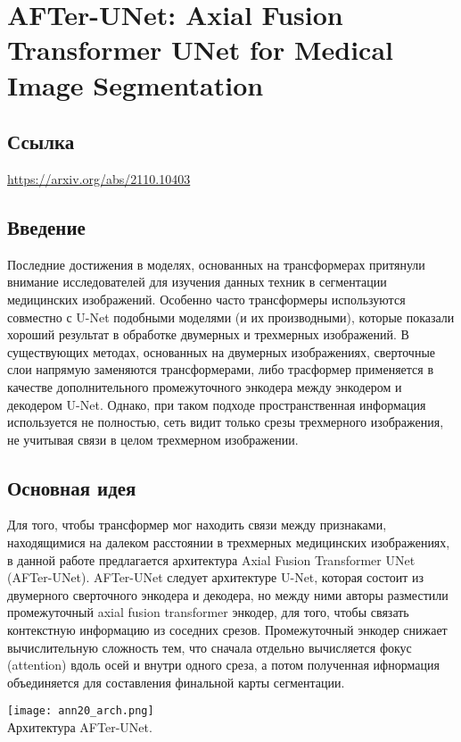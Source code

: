\section{AFTer-UNet: Axial Fusion Transformer UNet for Medical Image Segmentation}

\subsection*{Ссылка} \url{https://arxiv.org/abs/2110.10403}
\subsection*{Введение}
Последние достижения в моделях, основанных на трансформерах 
притянули внимание исследователей для изучения данных техник 
в сегментации медицинских изображений. Особенно часто трансформеры используются 
совместно с  U-Net подобными моделями (и их производными), которые показали 
хороший результат в обработке двумерных и трехмерных изображений.
В существующих методах, основанных на двумерных изображениях, 
сверточные слои напрямую заменяются трансформерами, либо трасформер применяется в 
качестве дополнительного промежуточного энкодера между энкодером и декодером U-Net. 
Однако, при таком подходе пространственная информация используется не полностью, сеть 
видит только срезы трехмерного изображения, не учитывая связи в целом трехмерном изображении.

\subsection*{Основная идея}
Для того, чтобы трансформер мог находить связи между признаками, 
находящимися на далеком расстоянии в трехмерных медицинских изображениях,
в данной работе предлагается архитектура Axial Fusion Transformer UNet (AFTer-UNet).
AFTer-UNet следует архитектуре U-Net, которая состоит из двумерного сверточного энкодера 
и декодера, но между ними авторы разместили промежуточный axial fusion transformer энкодер, 
для того, чтобы связать контекстную информацию из соседних срезов. Промежуточный 
энкодер снижает вычислительную сложность тем, что сначала отдельно вычисляется 
фокус (attention) вдоль осей и внутри одного среза, а потом полученная ифнормация 
объединяется для составления финальной карты сегментации.
\\
\begin{minipage}{1.0\linewidth}
    \begin{center}
        \texttt{[image: ann20\_arch.png]} \\
        \caption{\scriptsize{
            Архитектура AFTer-UNet.
        }}
    \end{center}
    
\end{minipage}
